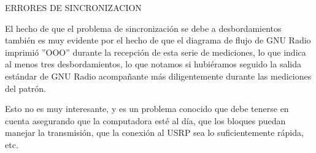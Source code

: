 \begin{frame}{ERRORES DE SINCRONIZACION}

El hecho de que el problema de sincronización se debe a desbordamientos también es muy evidente por el hecho de que el diagrama de flujo de GNU Radio imprimió ”OOO” durante la recepción de esta serie de mediciones, lo que indica al menos tres desbordamientos, lo que notamos si hubiéramos seguido la salida
estándar de GNU Radio acompañante más diligentemente durante las mediciones del patrón. \\ \vspace{2mm}

Esto no es muy interesante, y es un problema conocido que debe tenerse en cuenta asegurando que la computadora esté al día, que los bloques puedan manejar la transmisión, que la conexión al USRP sea lo suficientemente rápida, etc.\\ \vspace{2mm}

\end{frame}




